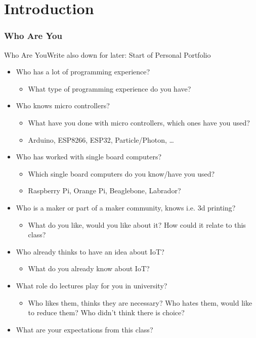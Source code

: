 ﻿\part{Introduction}

\section{Who Are You}

\begin{frame}{Who Are You}{Write also down for later: Start of \alert{Personal Portfolio}}
\begin{itemize}
    \item Who has a lot of \alert{programming experience}?
\begin{itemize}
    \item What type of programming experience do you have?
\end{itemize}
\item Who knows \alert{micro controllers}?
\begin{itemize}
\item What have you done with micro controllers, which ones have you used?
\item \alert{Arduino}, \alert{ESP8266}, \alert{ESP32}, Particle/Photon, \ldots
\end{itemize}
\item Who has worked with single board computers?
\begin{itemize}
\item Which single board computers do you know/have you used?
\item \alert{Raspberry Pi}, Orange Pi, Beaglebone, Labrador?
\end{itemize}
\item Who is a maker or part of a maker community, knows i.e. \alert{3d printing}?
\begin{itemize}
\item What do you like, would you like about it? How could it relate to this class?
\end{itemize}
\item Who already thinks to have an \alert{idea about IoT}?
\begin{itemize}
\item What do you already know about IoT?
\end{itemize}
\item What \alert{role do lectures play} for you in university?
\begin{itemize}
\item Who likes them, thinks they are necessary? Who hates them, would like to reduce them? Who didn’t think there
is choice?
\end{itemize}
\item What are your \alert{expectations from this class}?
\end{itemize}
\end{frame}
